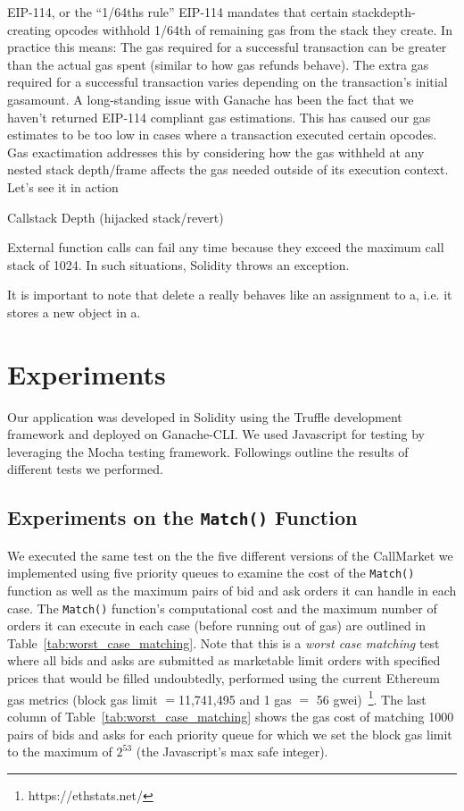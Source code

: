 EIP-114, or the “1/64ths rule”
EIP-114 mandates that certain stackdepth-creating opcodes withhold 1/64th of remaining gas from the stack they create. In practice this means:
The gas required for a successful transaction can be greater than the actual gas spent (similar to how gas refunds behave).
The extra gas required for a successful transaction varies depending on the transaction’s initial gasamount.
A long-standing issue with Ganache has been the fact that we haven’t returned EIP-114 compliant gas estimations. This has caused our gas estimates to be too low in cases where a transaction executed certain opcodes. Gas exactimation addresses this by considering how the gas withheld at any nested stack depth/frame affects the gas needed outside of its execution context.
Let’s see it in action


Callstack Depth (hijacked stack/revert)

External function calls can fail any time because they exceed the maximum call stack of 1024. In such situations, Solidity throws an exception.





It is important to note that delete a really behaves like an assignment to a, i.e. it stores a new object in a.


\section{Experiments}
Our application was developed in Solidity using the Truffle development framework and deployed on Ganache-CLI. We used Javascript for testing by leveraging the Mocha testing framework. Followings outline the results of different tests we performed.


 \subsection{Experiments on the \texttt{Match()} Function}

We executed the same test on the the five different versions of the CallMarket we implemented using five priority queues to examine the cost of the \texttt{Match()} function as well as the maximum pairs of bid and ask orders it can handle in each case. The \texttt{Match()} function's computational cost and the maximum number of orders it can execute in each case (before running out of gas) are outlined in Table~\ref{tab:worst_case_matching}. Note that this is a \textit{worst case matching} test where all bids and asks are submitted as marketable limit orders with specified prices that would be filled undoubtedly, performed using the current Ethereum gas metrics (block gas limit $=$11,741,495 and 1 gas $=$ 56 gwei)~\footnote{https://ethstats.net/}. The last column of Table~\ref{tab:worst_case_matching} shows the gas cost of matching 1000 pairs of bids and asks for each priority queue for which we set the block gas limit to the maximum of  $2^{53}$ (the Javascript's max safe integer).



